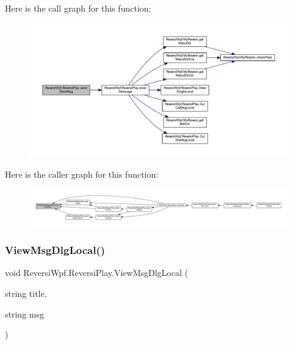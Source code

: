 Here is the call graph for this function\+:
\nopagebreak
\begin{figure}[H]
\begin{center}
\leavevmode
\includegraphics[width=350pt]{class_reversi_wpf_1_1_reversi_play_acf2427a8a68d437b792975866fbf754d_cgraph}
\end{center}
\end{figure}
Here is the caller graph for this function\+:
\nopagebreak
\begin{figure}[H]
\begin{center}
\leavevmode
\includegraphics[width=350pt]{class_reversi_wpf_1_1_reversi_play_acf2427a8a68d437b792975866fbf754d_icgraph}
\end{center}
\end{figure}
\mbox{\label{class_reversi_wpf_1_1_reversi_play_a3c3009d24aebf02f92d62b79ea01934c}} 
\subsubsection{\texorpdfstring{View\+Msg\+Dlg\+Local()}{ViewMsgDlgLocal()}}
{\footnotesize\ttfamily void Reversi\+Wpf.\+Reversi\+Play.\+View\+Msg\+Dlg\+Local (\begin{DoxyParamCaption}\item[{string}]{title,  }\item[{string}]{msg }\end{DoxyParamCaption})\hspace{0.3cm}{\ttfamily [private]}}



